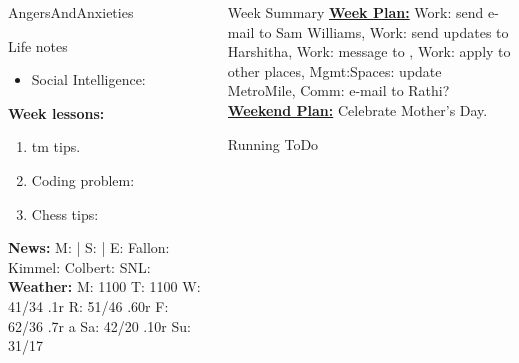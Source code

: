\begin{columns}
\begin{column}{0.10\linewidth}
\begin{block}{AngersAndAnxieties}
\begin{itemize}
      \end{itemize}
    \end{block}
      \begin{block}{Life notes}
        \begin{itemize}
          \tiny \item \tiny Social Intelligence: 
        \end{itemize}
      \end{block}
      \begin{block}
        {\tiny {\bf Week lessons:}}
        \begin{enumerate}
        \item \tiny tm tips. 
        \item \tiny Coding problem:
        \item \tiny Chess tips: 
        \end{enumerate}
            {{\tiny {\tiny \bf  News:}} {\tiny  M:  | S: 
                | E: Fallon:  Kimmel:  Colbert: SNL:}}
            {{\tiny {\tiny \bf  Weather:}} {\tiny M: 1100 T: 1100 W: 41/34 .1r 
                 R: 51/46 .60r F: 62/36 .7r a Sa: 42/20 .10r Su: 31/17 }}
      \end{block}
  \end{column}
  \begin{column}{0.6\linewidth}
    \begin{block}{Week Summary} 
      {\underline {\bf Week Plan:} 
        Work: send e-mail to Sam Williams, 
        Work: send updates to Harshitha, Work: message to , 
        Work: apply to other places, 
        Mgmt:Spaces: update MetroMile, Comm: e-mail to Rathi? 
      }\\ 
      {\underline{\bf Weekend Plan:} Celebrate Mother's Day. } \\
  
    \end{block}
    \begin{block}{Running ToDo} %
\end{block}
\end{column}
\end{columns}
